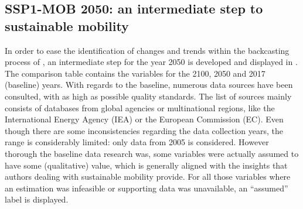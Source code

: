\subsection{SSP1-MOB 2050: an intermediate step to sustainable mobility}
\label{ss:results:backcasting-2050-intermediate-step}
In order to ease the identification of changes and trends within the backcasting process of , an intermediate step for the year 2050 is developed and displayed in . The comparison table contains the variables for the 2100, 2050 and 2017 (baseline) years. With regards to the baseline, numerous data sources have been consulted, with as high as possible quality standards. The list of sources mainly consists of databases from global agencies or multinational regions, like the International Energy Agency (IEA) or the European Commission (EC). Even though there are some inconsistencies regarding the data collection years, the range is considerably limited: only data from 2005 is considered. However thorough the baseline data research was, some variables were actually assumed to have some (qualitative) value, which is generally aligned with the insights that authors dealing with sustainable mobility provide. For all those variables where an estimation was infeasible or supporting data was unavailable, an ``assumed'' label is displayed.
%
